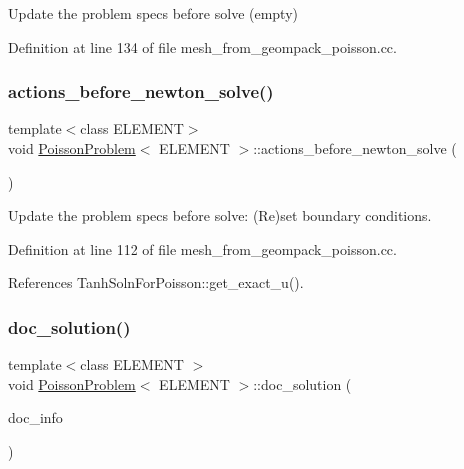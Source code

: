 Update the problem specs before solve (empty) 



Definition at line 134 of file mesh\+\_\+from\+\_\+geompack\+\_\+poisson.\+cc.

\mbox{\label{classPoissonProblem_a398608a5ff73b74c5a387b3f794c58df}} 
\subsubsection{\texorpdfstring{actions\+\_\+before\+\_\+newton\+\_\+solve()}{actions\_before\_newton\_solve()}}
{\footnotesize\ttfamily template$<$class E\+L\+E\+M\+E\+NT$>$ \\
void \hyperlink{classPoissonProblem}{Poisson\+Problem}$<$ E\+L\+E\+M\+E\+NT $>$\+::actions\+\_\+before\+\_\+newton\+\_\+solve (\begin{DoxyParamCaption}{ }\end{DoxyParamCaption})\hspace{0.3cm}{\ttfamily [inline]}}



Update the problem specs before solve\+: (Re)set boundary conditions. 



Definition at line 112 of file mesh\+\_\+from\+\_\+geompack\+\_\+poisson.\+cc.



References Tanh\+Soln\+For\+Poisson\+::get\+\_\+exact\+\_\+u().

\mbox{\label{classPoissonProblem_aab6f503fa242f687bb8452527bb7688f}} 
\subsubsection{\texorpdfstring{doc\+\_\+solution()}{doc\_solution()}}
{\footnotesize\ttfamily template$<$class E\+L\+E\+M\+E\+NT $>$ \\
void \hyperlink{classPoissonProblem}{Poisson\+Problem}$<$ E\+L\+E\+M\+E\+NT $>$\+::doc\+\_\+solution (\begin{DoxyParamCaption}\item[{Doc\+Info \&}]{doc\+\_\+info }\end{DoxyParamCaption})}



